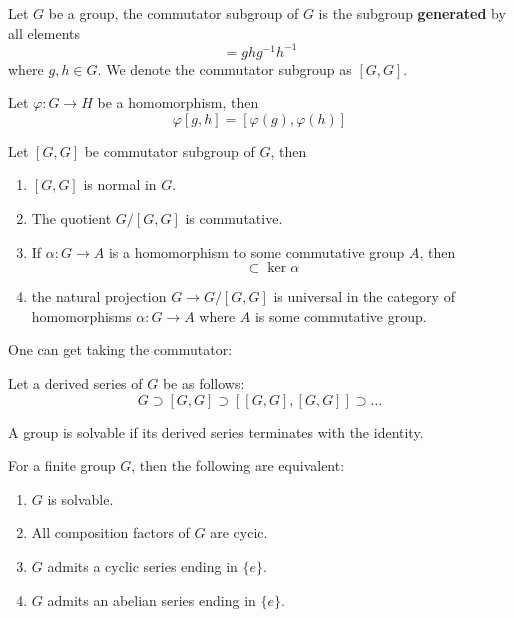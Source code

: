 \documentclass[openany]{book}
\begin{document}
\begin{defn}
    Let $G$ be a group, the commutator subgroup of $G$ is the subgroup \textbf{generated} by all elements 
    \begin{equation*}
        [g,h]=ghg^{-1}h^{-1}
    \end{equation*}
    where $g,h\in G$. We denote the commutator subgroup as $[G,G]$.
\end{defn}
\begin{lem}
    Let $\varphi:G\to H$ be a homomorphism, then 
    \begin{equation*}
        \varphi[g,h]=[\varphi(g),\varphi(h)]
    \end{equation*}
\end{lem}
\begin{prop}
    Let $[G,G]$ be commutator subgroup of $G$, then 
    \begin{enumerate}
        \item $[G,G]$ is normal in $G$.
        \item The quotient $G/[G,G]$ is commutative.
        \item If $\alpha: G\to A$ is a homomorphism to some commutative group $A$, then 
        \begin{equation*}
            [G,G]\subset\ker\alpha
        \end{equation*}
        \item the natural projection $G\to G/[G,G]$ is universal in the category of homomorphisms $\alpha:G\to A$ where $A$ is some commutative group.
    \end{enumerate}
\end{prop}
One can get taking the commutator:
\begin{defn}
    Let a derived series of $G$ be as follows:
    \begin{equation*}
        G\supset [G,G]\supset [[G,G], [G,G]]\supset\dots
    \end{equation*}
\end{defn}
\begin{defn}[solvable]
    A group is solvable if its derived series terminates with the identity.
\end{defn}
\begin{prop}
    For a finite group $G$, then the following are equivalent:
    \begin{enumerate}
        \item $G$ is solvable.
        \item All composition factors of $G$ are cycic.
        \item $G$ admits a cyclic series ending in $\{e\}$.
        \item $G$ admits an abelian series ending in $\{e\}$.
    \end{enumerate}
\end{prop}
\end{document}
